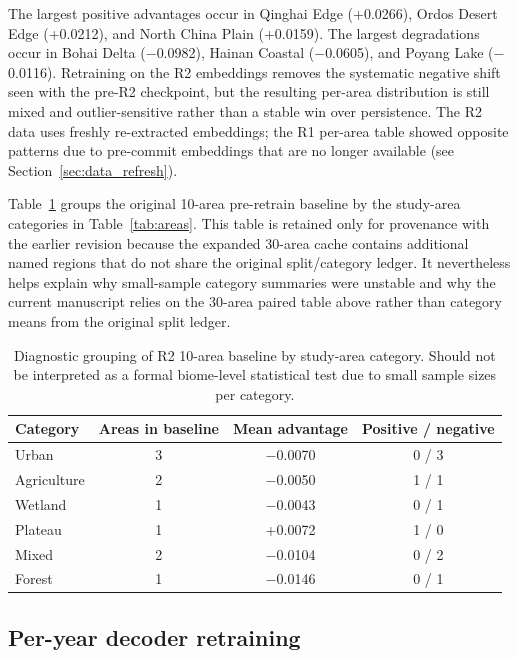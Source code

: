 \documentclass{article}
\begin{document}
The largest positive advantages occur in Qinghai Edge (+0.0266), Ordos Desert Edge (+0.0212), and North China Plain (+0.0159). The largest degradations occur in Bohai Delta ($-$0.0982), Hainan Coastal ($-$0.0605), and Poyang Lake ($-$0.0116). Retraining on the R2 embeddings removes the systematic negative shift seen with the pre-R2 checkpoint, but the resulting per-area distribution is still mixed and outlier-sensitive rather than a stable win over persistence. The R2 data uses freshly re-extracted embeddings; the R1 per-area table showed opposite patterns due to pre-commit embeddings that are no longer available (see Section~\ref{sec:data_refresh}).


Table~\ref{tab:category_diagnostic} groups the original 10-area pre-retrain baseline by the study-area categories in Table~\ref{tab:areas}. This table is retained only for provenance with the earlier revision because the expanded 30-area cache contains additional named regions that do not share the original split/category ledger. It nevertheless helps explain why small-sample category summaries were unstable and why the current manuscript relies on the 30-area paired table above rather than category means from the original split ledger.

\begin{table}[htbp]
\centering
\caption{Diagnostic grouping of R2 10-area baseline by study-area category. Should not be interpreted as a formal biome-level statistical test due to small sample sizes per category.}
\label{tab:category_diagnostic}
\small
\begin{tabular}{lccc}
\toprule
Category & Areas in baseline & Mean advantage & Positive / negative \\
\midrule
Urban & 3 & $-$0.0070 & 0 / 3 \\
Agriculture & 2 & $-$0.0050 & 1 / 1 \\
Wetland & 1 & $-$0.0043 & 0 / 1 \\
Plateau & 1 & +0.0072 & 1 / 0 \\
Mixed & 2 & $-$0.0104 & 0 / 2 \\
Forest & 1 & $-$0.0146 & 0 / 1 \\
\bottomrule
\end{tabular}
\end{table}

\subsection{Per-year decoder retraining}
\label{sec:peryear_decoder}
\end{document}
